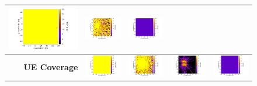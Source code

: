\documentclass[10pt,a4]{article}
\begin{document}
\begin{figure}[ht!]
{\begin{tabular}{r|cccc}
    \includegraphics[width=0.25\linewidth]{../kpm-plots/nr-rem-DL_COVERAGE_AREA-snr.pdf} &
    \includegraphics[width=0.25\linewidth]{../kpm-plots/nr-rem-DL_COVERAGE_AREA-sinr.pdf} &
    \includegraphics[width=0.25\linewidth]{../kpm-plots/nr-rem-DL_COVERAGE_AREA-sir.pdf} \\
    \hline
    \textbf{UE Coverage} &
    \includegraphics[width=0.25\linewidth]{../kpm-plots/nr-rem-DL_UE_COVERAGE-ipsd.pdf} &
    \includegraphics[width=0.25\linewidth]{../kpm-plots/nr-rem-DL_UE_COVERAGE-snr.pdf} &
    \includegraphics[width=0.25\linewidth]{../kpm-plots/nr-rem-DL_UE_COVERAGE-sinr.pdf} &
    \includegraphics[width=0.25\linewidth]{../kpm-plots/nr-rem-DL_UE_COVERAGE-sir.pdf} \\
    \end{tabular}}
    \end{figure}
\end{document}
